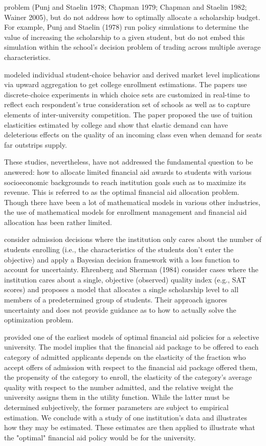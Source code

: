 \documentclass[12pt,english]{report}
\begin{document}
problem (Punj and Staelin 1978; Chapman 1979; Chapman and Staelin 1982; Wainer
2005), but do not address how to optimally allocate a scholarship budget. For
example, Punj and Staelin (1978) run policy simulations to determine the value
of increasing the scholarship to a given student, but do not embed this
simulation within the school's decision problem of trading across multiple
average characteristics.

\citet{Carter2011} modeled individual student-choice behavior and derived
market level implications via upward aggregation to get college enrollment
estimations. The papers use discrete-choice experiments in which choice sets
are customized in real-time to reflect each respondent's true consideration set
of schools as well as to capture elements of inter-university competition.  The
paper proposed the use of tuition elasticities estimated by college and show
that elastic demand can have deleterious effects on the quality of an incoming
class even when demand for seats far outstrips supply.

\vspace{0.25in}
These studies, nevertheless, have not addressed the fundamental question to be
answered: how to allocate limited financial aid awards to students with various
socioeconomic backgrounds to reach institution goals such as to maximize its
revenue. This is referred to as the optimal financial aid allocation problem.
Though there have been a lot of mathematical models in various other
industries, the use of mathematical models for enrollment management and
financial aid allocation has been rather limited.

\citet{Marsh2004} consider admission decisions where the institution only cares
about the number of students  enrolling (i.e., the characteristics of the
students don't enter the objective) and apply a Bayesian decision framework
with a loss function to account for uncertainty. Ehrenberg and Sherman (1984)
consider cases where the institution cares about a single, objective (observed)
quality index (e.g., SAT scores) and proposes a model that allocates a single
scholarship level to all members of a predetermined group of students. Their
approach ignores uncertainty and does not provide guidance as to how to
actually solve the optimization problem.

\citet{Ehrenberg1984} provided one of the earliest models of optimal financial
aid policies for a selective university. The model implies that the financial
aid package to be offered to each category of admitted applicants depends on
the elasticity of the fraction who accept offers of admission with respect to
the financial aid package offered them, the propensity of the category to
enroll, the elasticity of the category's average quality with respect to the
number admitted, and the relative weight the university assigns them in the
utility function. While the latter must be determined subjectively, the former
parameters are subject to empirical estimation. We conclude with a study of one
institution's data and illustrates how they may be estimated. These estimates
are then applied to illustrate what the "optimal" financial aid policy would be
for the university.
\end{document}
